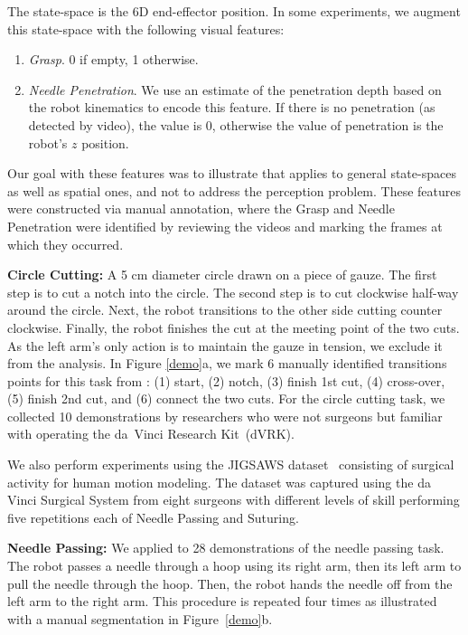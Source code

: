 The state-space is the 6D end-effector position.
In some experiments, we augment this state-space with the following visual features:
\begin{enumerate}
\item \emph{Grasp}. 0 if empty, 1 otherwise.
\item \emph{Needle Penetration}. We use an estimate of the penetration depth based on the robot kinematics to encode this feature. 
If there is no penetration (as detected by video), the value is 0, otherwise the value of penetration is the robot's $z$ position.
\end{enumerate}
Our goal with these features was to illustrate that \tsc applies to general state-spaces as well as spatial ones, and not to address the perception problem.
These features were constructed via manual annotation, where the Grasp and Needle Penetration were identified by reviewing the videos and marking the frames at which they occurred.

\vspace{0.5em}

\noindent\textbf{Circle Cutting: }
A 5 cm diameter circle drawn on a piece of gauze.
The first step is to cut a notch into the circle.
The second step is to cut clockwise half-way around the circle.
Next, the robot transitions to the other side cutting counter clockwise.
Finally, the robot finishes the cut at the meeting point of the two cuts.
As the left arm's only action is to maintain the gauze in tension, we exclude it from the analysis. 
In Figure \ref{demo}a, we mark 6 manually identified transitions points for this task from \cite{murali2015learning}: (1) start, (2) notch, (3) finish 1st cut, (4) cross-over, (5) finish 2nd cut, and (6) connect the two cuts.
For the circle cutting task, we collected 10 demonstrations by researchers who were not surgeons but familiar with operating the da~Vinci Research Kit~(dVRK).

\vspace{0.5em}
We also perform experiments using the JIGSAWS dataset~\cite{gao2014jigsaws} consisting of surgical activity for human motion modeling. The dataset was captured using the da Vinci Surgical System from eight surgeons with different levels of skill performing five repetitions each of Needle Passing and Suturing.

\vspace{0.5em}

\noindent\textbf{Needle Passing: } We applied \tsc to 28 demonstrations of the needle passing task.
The robot passes a needle through a hoop using its right arm, then its left arm to pull the needle through the hoop. Then, the robot hands the needle off from the left arm to the right arm. This procedure is repeated four times as illustrated with a manual segmentation in Figure~\ref{demo}b.

